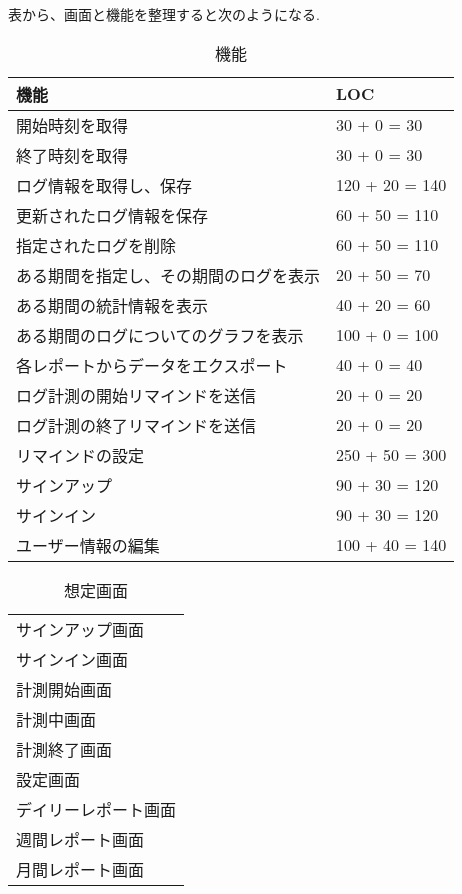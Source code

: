 表から、画面と機能を整理すると次のようになる.

\begin{table}[H]
  \centering
  \caption{機能}
  \begin{tabular}{|l|l|}
  \hline
    機能 & LOC \\
  \hline

  \hline
    開始時刻を取得 & 30 + 0 = 30 \\
  \hline
    終了時刻を取得 & 30 + 0 = 30 \\
  \hline
    ログ情報を取得し、保存 & 120 + 20 = 140 \\
  \hline
    更新されたログ情報を保存 & 60 + 50 = 110 \\
  \hline
    指定されたログを削除 & 60 + 50 = 110 \\
  \hline

  \hline
    ある期間を指定し、その期間のログを表示 & 20 + 50 = 70 \\
  \hline
    ある期間の統計情報を表示 & 40 + 20 = 60 \\
  \hline
    ある期間のログについてのグラフを表示 & 100 + 0 = 100 \\
  \hline
    各レポートからデータをエクスポート & 40 + 0 = 40 \\
  \hline

  \hline
    ログ計測の開始リマインドを送信 & 20 + 0 = 20 \\
  \hline
    ログ計測の終了リマインドを送信 & 20 + 0 = 20 \\
  \hline
    リマインドの設定 & 250 + 50 = 300 \\
  \hline

  \hline
    サインアップ &  90 + 30 = 120 \\
  \hline
    サインイン & 90 + 30 = 120 \\
  \hline
    ユーザー情報の編集 & 100 + 40 = 140 \\
  \hline
  \end{tabular}
\end{table}

\begin{table}[H]
  \centering
  \caption{想定画面}
  \begin{tabular}{|l|}
  \hline
    サインアップ画面  \\
    サインイン画面 \\
    計測開始画面 \\
    計測中画面 \\
    計測終了画面 \\
    設定画面 \\
    デイリーレポート画面 \\
    週間レポート画面 \\
    月間レポート画面 \\
  \hline
  \end{tabular}
\end{table}


